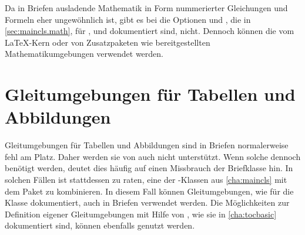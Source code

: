 \iffalse %
  Die \KOMAScript-Klassen stellen keine eigenen Umgebungen für mathematische
  Formeln, Gleichungssysteme oder ähnliche Elemente der Mathematik
  bereit. Stattdessen stützt sich \KOMAScript{} im Bereich der Mathematik voll
  und ganz auf den \LaTeX-Kern. Da\textnote{Achtung!} jedoch Mathematik in Form
  von nummerierten Gleichungen und Formeln in Briefen eher ungewöhnlich ist, %
  \iffalse %
  unterstützt \Class{scrlttr2} dies nicht aktiv. Daher gibt es auch %
  \else%
  gibt es bei \Class{scrlttr2} %
  \fi%
  nicht die Optionen \DescRef{maincls.option.leqno} und
  \DescRef{maincls.option.fleqn}, die in \autoref{sec:maincls.math},
  \autopageref{sec:maincls.math} für \Class{scrbook}, \Class{scrreprt} und
  \Class{scrartcl} dokumentiert sind.%
  %
\else%
  Da in Briefen ausladende Mathematik in Form nummerierter Gleichungen und
  Formeln eher ungewöhnlich ist, gibt es bei  die Optionen
   und , die in
  \autoref{sec:maincls.math},  für
  ,  und  dokumentiert sind,
  nicht. Dennoch können die vom \LaTeX-Kern oder von Zusatzpaketen wie
   bereitgestellten
  Mathematikumgebungen verwendet werden.%
\fi%
%
\EndIndexGroup


\section{Gleitumgebungen für Tabellen und Abbildungen}

Gleitumgebungen für Tabellen und Abbildungen sind in Briefen normalerweise
fehl am Platz. Daher werden sie von  auch
nicht unterstützt. Wenn solche dennoch benötigt werden, deutet dies häufig auf
einen Missbrauch der Briefklasse hin. In solchen Fällen ist stattdessen zu
raten, eine der \KOMAScript-Klassen aus \autoref{cha:maincls} mit dem Paket
 zu kombinieren. In diesem
Fall können Gleitumgebungen, wie für die Klasse dokumentiert, auch in Briefen
verwendet werden. Die Möglichkeiten zur Definition eigener Gleitumgebungen mit
Hilfe von \hyperref[cha:tocbasic]{}%
, wie sie in
\autoref{cha:tocbasic} dokumentiert sind, können ebenfalls genutzt werden.


